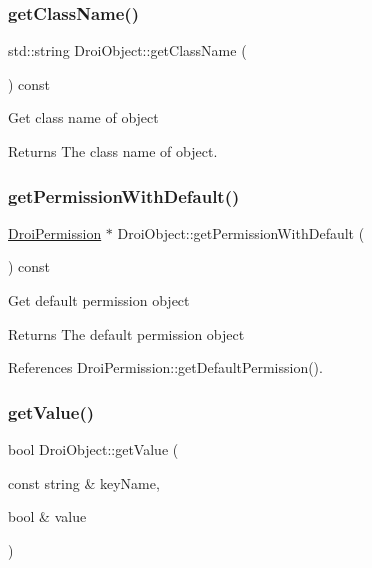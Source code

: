 \subsubsection{\texorpdfstring{get\+Class\+Name()}{getClassName()}}
{\footnotesize\ttfamily std\+::string Droi\+Object\+::get\+Class\+Name (\begin{DoxyParamCaption}{ }\end{DoxyParamCaption}) const\hspace{0.3cm}{\ttfamily [inline]}}

Get class name of object \begin{DoxyReturn}{Returns}
The class name of object. 
\end{DoxyReturn}
\mbox{\label{class_droi_object_ac44409512c6e6bbf0c804819f99f0084}} 
\subsubsection{\texorpdfstring{get\+Permission\+With\+Default()}{getPermissionWithDefault()}}
{\footnotesize\ttfamily \hyperlink{class_droi_permission}{Droi\+Permission} $\ast$ Droi\+Object\+::get\+Permission\+With\+Default (\begin{DoxyParamCaption}{ }\end{DoxyParamCaption}) const}

Get default permission object \begin{DoxyReturn}{Returns}
The default permission object 
\end{DoxyReturn}


References Droi\+Permission\+::get\+Default\+Permission().

\mbox{\label{class_droi_object_a0d9c5af32df88e7c26f2facd58e104c2}} 
\subsubsection{\texorpdfstring{get\+Value()}{getValue()}\hspace{0.1cm}{\footnotesize\ttfamily [1/11]}}
{\footnotesize\ttfamily bool Droi\+Object\+::get\+Value (\begin{DoxyParamCaption}\item[{const string \&}]{key\+Name,  }\item[{bool \&}]{value }\end{DoxyParamCaption})}

